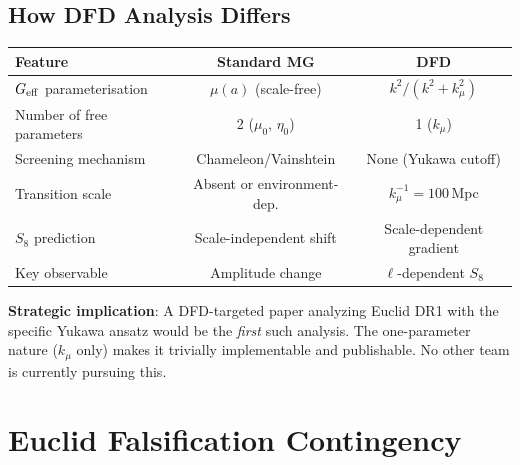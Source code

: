 \documentclass[11pt,a4paper]{article}
\newcommand{\kmu}{k_\mu}
\newcommand{\Geff}{G_{\rm eff}}
\begin{document}
\subsection{How DFD Analysis Differs}

\begin{center}
\begin{tabular}{lcc}
\toprule
\textbf{Feature} & \textbf{Standard MG} & \textbf{DFD} \\
\midrule
$\Geff$ parameterisation & $\mu(a)$ (scale-free) & $k^2/(k^2+\kmu^2)$ \\
Number of free parameters & 2 ($\mu_0$, $\eta_0$) & 1 ($\kmu$) \\
Screening mechanism & Chameleon/Vainshtein & None (Yukawa cutoff) \\
Transition scale & Absent or environment-dep. & $\kmu^{-1} = 100$\,Mpc \\
$S_8$ prediction & Scale-independent shift & Scale-dependent gradient \\
Key observable & Amplitude change & $\ell$-dependent $S_8$ \\
\bottomrule
\end{tabular}
\end{center}

\textbf{Strategic implication}: A DFD-targeted paper analyzing Euclid
DR1 with the specific Yukawa ansatz would be the \emph{first} such
analysis. The one-parameter nature ($\kmu$ only) makes it trivially
implementable and publishable. No other team is currently pursuing this.


\section{Euclid Falsification Contingency}
\label{sec:euclid_contingency}
\end{document}
